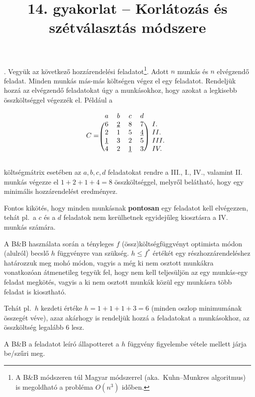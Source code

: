 \documentclass[12pt]{article}
\title{14. gyakorlat -- Korlátozás és szétválasztás módszere}
\begin{document}
\maketitle

. Vegyük az következő hozzárendelési feladatot\footnote{A B\&B módszeren túl Magyar módszerrel (aka.~Kuhn–Munkres algoritmus) is megoldható a probléma $O(n^3)$ időben.}. Adott $n$ munkás és $n$ elvégzendő feladat. Minden munkás más-más költségen végez el egy feladatot. Rendeljük hozzá az elvégzendő feladatokat úgy a munkásokhoz, hogy azokat a legkisebb összköltséggel végezzék el. Például a

\[
C = \begin{blockarray}{ccccc}
a & b & c & d \\
\begin{block}{(cccc)l}
  6 & \underline{2} & 8 & 7 & I. \\
  2 & 1 & 5 & \underline{4} & II.\\
  \underline{1} & 3 & 2 & 5 & III. \\
  4 & 2 & \underline{1} & 3 & IV. \\
\end{block}
\end{blockarray}
 \]

\noindent költségmátrix esetében az $a,b,c,d$ feladatokat rendre a III., I., IV., valamint II. munkás végezze el $1+2+1+4=8$ összköltséggel, melyről belátható, hogy egy minimális hozzárendelést eredményez.

Fontos kikötés, hogy minden munkásnak \textbf{pontosan} egy feladatot kell elvégezzen, tehát pl.~a $c$ és a $d$ feladatok nem kerülhetnek egyidejűleg kiosztásra a IV. munkás számára.

A B\&B használata során a tényleges $f$ (össz)költségfüggvényt optimista módon (alulról) becslő $h$ függvényre van szükség. $h\le f^*$ értékét egy részhozzárendeléshez határozzuk meg mohó módon, vagyis a még ki nem osztott munkákra vonatkozóan átmenetileg tegyük fel, hogy nem kell teljesüljön az egy munkás-egy feladat megkötés, vagyis a ki nem osztott munkák közül egy munkásra több feladat is kiosztható.

Tehát pl.~$h$ kezdeti értéke $h=1+1+1+3=6$ (minden oszlop minimumának összegét véve), azaz akárhogy is rendeljük hozzá a feladatokat a munkásokhoz, az összköltség legalább $6$ lesz.

A B\&B a feladatot leíró állapotteret a $h$ függvény figyelembe vétele mellett járja be/szűri meg.
\end{document}

